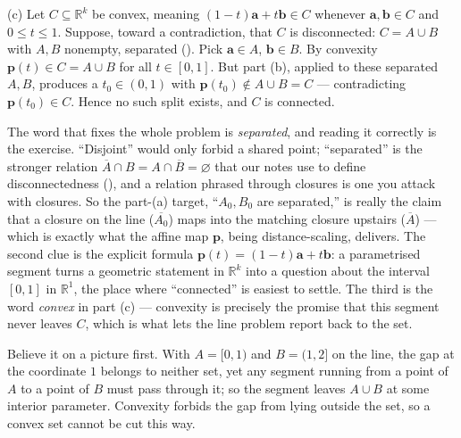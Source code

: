 \documentclass[main.tex]{subfiles}
\begin{document}
\begin{SolutionBlue}
(c) Let $C\subseteq\mathbb R^{k}$ be convex, meaning $(1-t)\mathbf a+t\mathbf b\in C$ whenever $\mathbf
a,\mathbf b\in C$ and $0\le t\le 1$. Suppose, toward a contradiction, that $C$ is disconnected: $C=A\cup B$
with $A,B$ nonempty, separated (). Pick $\mathbf a\in A$, $\mathbf b\in B$. By convexity
$\mathbf p(t)\in C=A\cup B$ for all $t\in[0,1]$. But part (b), applied to these separated $A,B$, produces a
$t_{0}\in(0,1)$ with $\mathbf p(t_{0})\notin A\cup B=C$ --- contradicting $\mathbf p(t_{0})\in C$. Hence no
such split exists, and $C$ is connected.
\end{SolutionBlue}

\begin{Reflection}
The word that fixes the whole problem is \emph{separated}, and reading it correctly is the exercise.
``Disjoint'' would only forbid a shared point; ``separated'' is the stronger relation $\overline A\cap
B=A\cap\overline B=\varnothing$ that our notes use to define disconnectedness (), and a
relation phrased through closures is one you attack with closures. So the part-(a) target,
``$A_{0},B_{0}$ are separated,'' is really the claim that a closure on the line ($\overline{A_{0}}$) maps
into the matching closure upstairs ($\overline A$) --- which is exactly what the affine map $\mathbf p$,
being distance-scaling, delivers. The second clue is the explicit formula $\mathbf p(t)=(1-t)\mathbf
a+t\mathbf b$: a parametrised segment turns a geometric statement in $\mathbb R^{k}$ into a question about
the interval $[0,1]$ in $\mathbb R^{1}$, the place where ``connected'' is easiest to settle. The third is
the word \emph{convex} in part (c) --- convexity is precisely the promise that this segment never leaves
$C$, which is what lets the line problem report back to the set.

Believe it on a picture first. With $A=[0,1)$ and $B=(1,2]$ on the line, the gap at the coordinate $1$
belongs to neither set, yet any segment running from a point of $A$ to a point of $B$ must pass through
it; so the segment leaves $A\cup B$ at some interior parameter. Convexity forbids the gap from lying
outside the set, so a convex set cannot be cut this way.


\end{Reflection}
\end{document}
